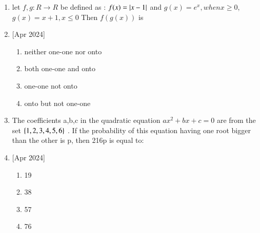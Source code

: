 \documentclass[journal]{IEEEtran}
\begin{document}
\begin{enumerate}
    \item let $f,g: R\rightarrow R $ be defined as : $f(x)=\left\vert x-1\right\vert$ and $g(x)=e^x, when x\geq 0$,$g(x)=x+1, x\leq 0$ Then $f(g(x))$ is
     \item{[Apr 2024]}
    \begin{multicols}{2}
            \begin{enumerate}
              \item neither one-one nor onto
              \item both one-one and onto
              \item one-one not onto
              \item onto but not one-one
            \end{enumerate}
        \end{multicols}
        \item The coefficients a,b,c in the quadratic equation $ax^2+bx+c=0$ are from the set $\left\{1,2,3,4,5,6\right\}$ . If the probability of this equation having one root bigger than the other is p, then 216p is equal to:
         \item{[Apr 2024]}
        \begin{multicols}{4}
            \begin{enumerate}
              \item 19
              \item  38
              \item 57
              \item 76
            \end{enumerate}
        \end{multicols}
 \end{enumerate}
\end{document}
